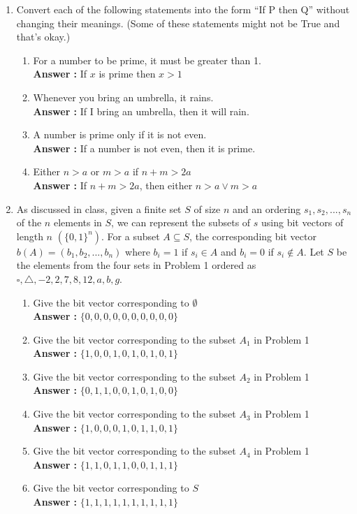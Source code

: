 \documentclass[a4paper,11pt]{article}
\begin{document}
\begin{enumerate}
\item Convert each of the following statements into the form “If P then Q” without changing
their meanings. (Some of these statements might not be True and that’s okay.)
  \begin{enumerate}
  \item For a number to be prime, it must be greater than 1. \\
  \textbf{Answer :} If $x$ is prime then $x > 1$
  \item Whenever you bring an umbrella, it rains. \\
  \textbf{Answer :} If I bring an umbrella, then it will rain.
  \item A number is prime only if it is not even. \\
  \textbf{Answer :} If a number is not even, then it is prime.  
  \item Either $n > a$ or $m > a$ if $n+m > 2a$ \\
  \textbf{Answer :} If $n+m > 2a$, then either $n > a \vee m > a$
  \end{enumerate}


\item As discussed in class, given a finite set $S$ of size $n$ and an ordering $s_1, s_2, . . . , s_n$ of the $n$
elements in $S$, we can represent the subsets of $s$ using bit vectors of length $n$ $(\{0, 1 \}^n)$. For a subset $A \subseteq S$, the corresponding bit vector $b(A) = (b_1, b_2, . . . , b_n)$ where $b_i = 1 $ if $ s_i \in A$ and $b_i = 0$ if $ s_i  \not\in A$.
Let $S$ be the elements from the four sets in Problem 1 ordered as $\square, \triangle, -2, 2, 7, 8, 12, a, b, g$.
  \begin{enumerate}
  \item Give the bit vector corresponding to $\emptyset$ \\
  \textbf{Answer :} $ \{ 0, 0, 0, 0, 0, 0, 0, 0, 0, 0 \}$
  \item  Give the bit vector corresponding to the subset $A_1$ in Problem 1 \\
  \textbf{Answer :} $ \{ 1, 0, 0, 1, 0, 1, 0, 1, 0, 1 \}$
  \item  Give the bit vector corresponding to the subset $A_2$ in Problem 1 \\
  \textbf{Answer :} $ \{ 0, 1, 1, 0, 0, 1, 0, 1, 0, 0 \}$
  \item  Give the bit vector corresponding to the subset $A_3$ in Problem 1 \\
  \textbf{Answer :} $ \{ 1, 0, 0, 0, 1, 0, 1, 1, 0, 1\}$
  \item   Give the bit vector corresponding to the subset $A_4$ in Problem 1 \\
  \textbf{Answer :} $ \{ 1, 1, 0, 1, 1, 0, 0, 1, 1, 1\}$
  \item Give the bit vector corresponding to $S$ \\
  \textbf{Answer :} $ \{ 1, 1, 1, 1, 1, 1, 1, 1, 1, 1 \}$




\end{enumerate}
\end{enumerate}
\end{document}
